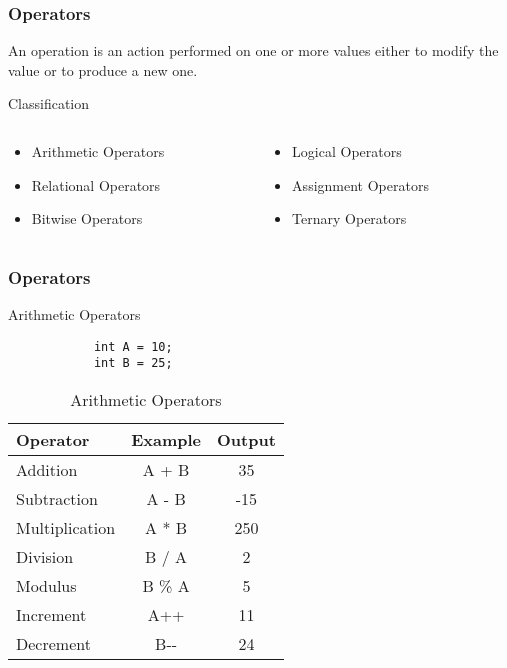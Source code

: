 \documentclass[10pt, compress]{beamer}
\begin{document}
\begin{frame}[fragile]
	\frametitle{Operators}
	An operation is an action performed on one or more values either to modify the value or to produce a new one.
	\begin{block}{Classification}
		\begin{columns}
			\begin{column}{0.5\textwidth}
				\begin{itemize}
					\item[] Arithmetic Operators
					\item[] Relational Operators
					\item[] Bitwise Operators
				\end{itemize}
			\end{column}
			\begin{column}{0.5\textwidth}
				\begin{itemize}
					\item[] Logical Operators
					\item[] Assignment Operators
					\item[] Ternary Operators
				\end{itemize}
			\end{column}
		\end{columns}
	\end{block}
\end{frame}

\begin{frame}[fragile]
	\frametitle{Operators}
	\begin{block}{Arithmetic Operators}
		\begin{verbatim}
			int A = 10;
			int B = 25;
		\end{verbatim}
		\begin{table}
			\begin{tabular}{lcc}
				\toprule
				Operator & Example & Output\\
				\midrule
				Addition & A + B & 35 \\
				Subtraction & A - B & -15\\
				Multiplication & A * B & 250\\
				Division & B / A & 2\\
				Modulus & B \% A & 5\\
				Increment & A++ & 11\\
				Decrement & B-{}- & 24\\
				\bottomrule
			\end{tabular}
			\caption{Arithmetic Operators}
		\end{table}
	\end{block}
\end{frame}
\end{document}
